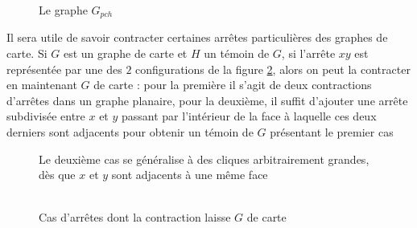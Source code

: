 \documentclass{scrartcl}
\begin{document}
\begin{flushleft}
\begin{figure}[h]
    \caption{Le graphe $G_{pch}$}\label{Gpch}
    \begin{center}

    \end{center}
\end{figure}

Il sera utile de savoir contracter certaines arrêtes particulières des graphes de carte. Si $G$ est un graphe de carte
et $H$ un témoin de $G$, si l'arrête $xy$ est représentée par une des $2$ configurations de la figure \ref{IzEdge}, alors
on peut la contracter en maintenant $G$ de carte : pour la première il s'agit de deux contractions d'arrêtes dans un graphe
planaire, pour la deuxième, il suffit d'ajouter une arrête subdivisée entre $x$ et $y$ passant par l'intérieur de la face à laquelle
ces deux derniers sont adjacents pour obtenir un témoin de $G$ présentant le premier cas

\begin{figure}[h]
    \caption{Cas d'arrêtes dont la contraction laisse $G$ de carte}\label{IzEdge}
    \begin{center}
        Le deuxième cas se généralise à des cliques arbitrairement grandes, dès que $x$ et $y$ sont adjacents à une même face
        \\~\\
\end{center}
\end{figure}
\end{flushleft}
\end{document}
